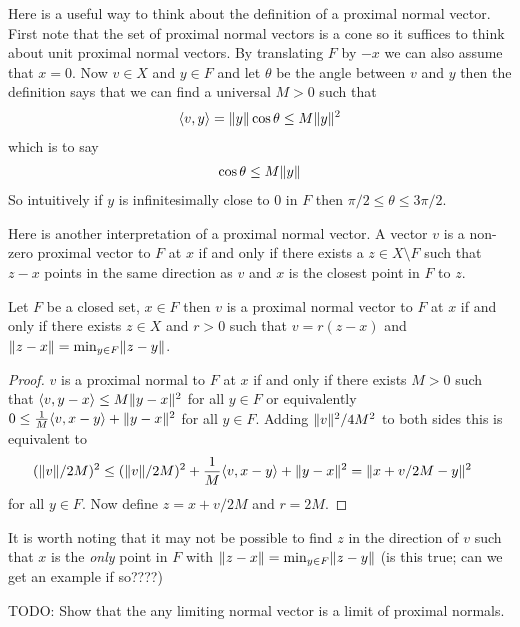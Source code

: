 Here is a useful way to think about the definition of a proximal normal vector.  First note that the set of proximal normal vectors is a cone so it suffices to think about unit proximal normal vectors.  By translating $F$ by $-x$ we can also assume that $x=0$.  Now $v \in X$ and $y \in F$ and let $\theta$ be the angle between $v$ and $y$ then the 
definition says that we can find a universal $M > 0$ such that
\begin{align*}
\langle v, y \rangle = \lVert y \rVert \cos \theta \leq M \lVert y \rVert^2
\end{align*}
which is to say
\begin{align*}
\cos \theta \leq M \lVert y \rVert
\end{align*}
So intuitively if $y$ is infinitesimally close to $0$ in $F$ then $\pi/2 \leq \theta \leq 3\pi/2$.  

Here is another interpretation of a proximal normal vector.  A vector $v$ is a non-zero proximal vector to $F$ at $x$ if and only if there exists a $z \in X \setminus F$ such that $z -x$ points in the same direction as $v$ and $x$ is the closest point in $F$ to $z$.  
\begin{prop}\label{ProximalNormalVectorRealizedByBalls}Let $F$ be a closed set, $x \in F$ then $v$ is a proximal normal vector to $F$ at $x$ if and only if there exists $z \in X$ and $r > 0$ such that $v = r (z - x)$ and 
$\lVert z - x \rVert = \min_{y \in F} \lVert z - y \rVert$.
\end{prop}
\begin{proof}
$v$ is a proximal normal to $F$ at $x$ if and only if there exists $M > 0$ such that $\langle v, y - x \rangle \leq M \lVert y - x \rVert^2$ for all $y \in F$ or equivalently $0 \leq \frac{1}{M} \langle v, x - y \rangle + \lVert y - x \rVert^2$ for all $y \in F$.  Adding $\lVert v \rVert^2/4M^2$ to both sides this is equivalent to 
\begin{align*}
(\lVert v \rVert/2M)^2 &\leq (\lVert v \rVert/2M)^2 + \frac{1}{M} \langle v, x - y \rangle + \lVert y - x \rVert^2 = \lVert  x + v/2M - y \rVert^2
\end{align*}
for all $y \in F$. Now define $z = x + v/2M$ and $r = 2M$.
\end{proof}
It is worth noting that it may not be possible to find $z$ in the direction of $v$ such that $x$ is the \emph{only} point in $F$ with $\lVert z-x \rVert = \min_{y \in F} \lVert z-y \rVert$ (is this true; can we get an example if so????)

TODO: Show that the any limiting normal vector is a limit of proximal normals.

